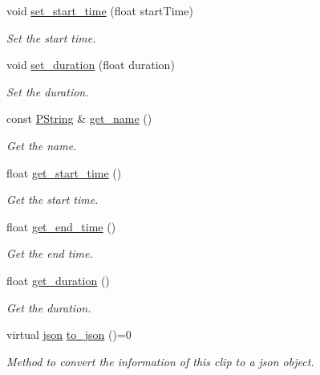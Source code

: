 \begin{DoxyCompactItemize}
void \mbox{\hyperlink{classprz_1_1_clip_a7cbb55c3a344ab273d655f3b1e3fe5d1}{set\+\_\+start\+\_\+time}} (float start\+Time)
\begin{DoxyCompactList}\small\item\em Set the start time. \end{DoxyCompactList}\item 
void \mbox{\hyperlink{classprz_1_1_clip_a7555fe34e45f6032ea282ca6d605ace6}{set\+\_\+duration}} (float duration)
\begin{DoxyCompactList}\small\item\em Set the duration. \end{DoxyCompactList}\item 
const \mbox{\hyperlink{classprz_1_1_p_string}{P\+String}} \& \mbox{\hyperlink{classprz_1_1_clip_accaf42d7a82d41ad70032870981f8d83}{get\+\_\+name}} ()
\begin{DoxyCompactList}\small\item\em Get the name. \end{DoxyCompactList}\item 
float \mbox{\hyperlink{classprz_1_1_clip_a65df9388088c8a607e90b73506550cd5}{get\+\_\+start\+\_\+time}} ()
\begin{DoxyCompactList}\small\item\em Get the start time. \end{DoxyCompactList}\item 
float \mbox{\hyperlink{classprz_1_1_clip_acfe08e188c11afa8ca32b334907fe9f9}{get\+\_\+end\+\_\+time}} ()
\begin{DoxyCompactList}\small\item\em Get the end time. \end{DoxyCompactList}\item 
float \mbox{\hyperlink{classprz_1_1_clip_a6e870ff68a0f4ff4759007ddb4853f03}{get\+\_\+duration}} ()
\begin{DoxyCompactList}\small\item\em Get the duration. \end{DoxyCompactList}\item 
virtual \mbox{\hyperlink{namespaceprz_a2d8e9eeb62cf098759f1fff869da67f7}{json}} \mbox{\hyperlink{classprz_1_1_clip_a4959ada0fab0fbac6cb5239578ac3ec6}{to\+\_\+json}} ()=0
\begin{DoxyCompactList}\small\item\em Method to convert the information of this clip to a json object. \end{DoxyCompactList}\end{DoxyCompactItemize}
